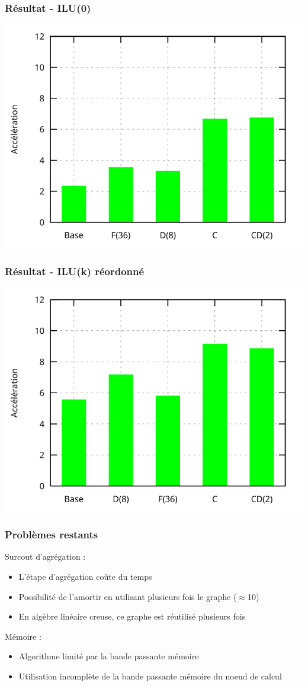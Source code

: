 \documentclass{beamer}
\begin{document}
\begin{frame}
  \frametitle{Résultat - ILU(0)}
  \centerline{\includegraphics[width=0.8\linewidth]{res_ilu0}}
\end{frame}


\begin{frame}
  \frametitle{Résultat - ILU(k) réordonné}
  \centerline{\includegraphics[width=0.8\linewidth]{res_iluk}}
\end{frame}


\begin{frame}
  \frametitle{Problèmes restants}

  Surcout d'agrégation :
  \begin{itemize}
    \item L'étape d'agrégation coûte du temps
    \item Possibilité de l'amortir en utilisant plusieurs fois le graphe ($\approx$10)
    \item En algèbre linéaire creuse, ce graphe est réutilisé plusieurs fois
  \end{itemize}

  Mémoire :
  \begin{itemize}
    \item Algorithme limité par la bande passante mémoire
    \item Utilisation incomplète de la bande passante mémoire du noeud de calcul
  \end{itemize}
\end{frame}
\end{document}
